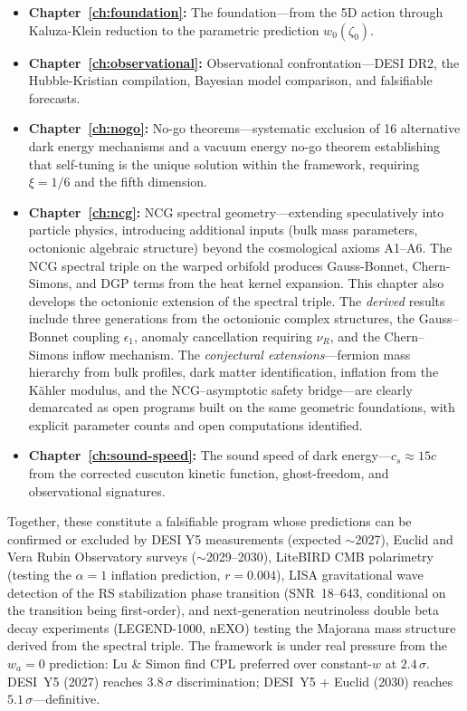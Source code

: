 \documentclass[10pt,a4paper,openany,twocolumn]{book}
\theoremstyle{definition}
\theoremstyle{remark}
\begin{document}
\begin{itemize}
\item \textbf{Chapter~\ref{ch:foundation}:} The foundation---from the 5D action through Kaluza-Klein reduction to the parametric prediction $w_0(\zeta_0)$.
\item \textbf{Chapter~\ref{ch:observational}:} Observational confrontation---DESI DR2, the Hubble-Kristian compilation, Bayesian model comparison, and falsifiable forecasts.
\item \textbf{Chapter~\ref{ch:nogo}:} No-go theorems---systematic exclusion of 16 alternative dark energy mechanisms and a vacuum energy no-go theorem establishing that self-tuning is the unique solution within the framework, requiring $\xi = 1/6$ and the fifth dimension.
\item \textbf{Chapter~\ref{ch:ncg}:} NCG spectral geometry---extending speculatively into particle physics, introducing additional inputs (bulk mass parameters, octonionic algebraic structure) beyond the cosmological axioms A1--A6. The NCG spectral triple on the warped orbifold produces Gauss-Bonnet, Chern-Simons, and DGP terms from the heat kernel expansion. This chapter also develops the octonionic extension of the spectral triple. The \emph{derived} results include three generations from the octonionic complex structures, the Gauss--Bonnet coupling $\epsilon_1$, anomaly cancellation requiring $\nu_R$, and the Chern--Simons inflow mechanism. The \emph{conjectural extensions}---fermion mass hierarchy from bulk profiles, dark matter identification, inflation from the K\"ahler modulus, and the NCG--asymptotic safety bridge---are clearly demarcated as open programs built on the same geometric foundations, with explicit parameter counts and open computations identified.
\item \textbf{Chapter~\ref{ch:sound-speed}:} The sound speed of dark energy---$c_s \approx 15c$ from the corrected cuscuton kinetic function, ghost-freedom, and observational signatures.
\end{itemize}

Together, these constitute a falsifiable program whose predictions can be confirmed or excluded by DESI Y5 measurements (expected $\sim$2027), Euclid and Vera Rubin Observatory surveys ($\sim$2029--2030), LiteBIRD CMB polarimetry (testing the $\alpha = 1$ inflation prediction, $r = 0.004$), LISA gravitational wave detection of the RS stabilization phase transition (SNR~18--643, conditional on the transition being first-order), and next-generation neutrinoless double beta decay experiments (LEGEND-1000, nEXO) testing the Majorana mass structure derived from the spectral triple. The framework is under real pressure from the $w_a = 0$ prediction: Lu \& Simon find CPL preferred over constant-$w$ at $2.4\,\sigma$. DESI~Y5 (2027) reaches $3.8\,\sigma$ discrimination; DESI~Y5 + Euclid (2030) reaches $5.1\,\sigma$---definitive.
\end{document}
